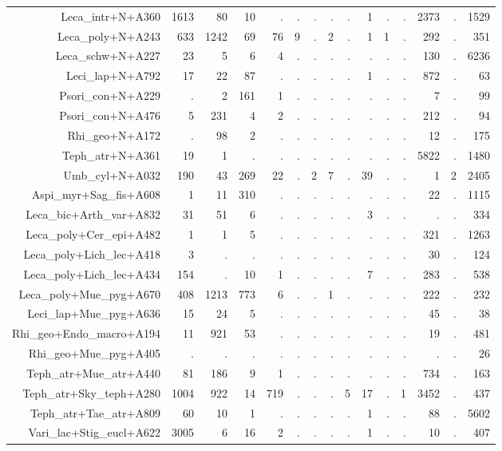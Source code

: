 \documentclass[a4paper, 11]{article}\usepackage[]{graphicx}\usepackage[]{color}
\begin{document}
\begin{table}
\begin{tabular}{rrrrrrrrrrrrrrr}
  Leca\_intr+N+A360 & 1613 & 80 & 10 & . & . & . & . & . & 1 & . & . & 2373 & . & 1529 \\ 
  Leca\_poly+N+A243 & 633 & 1242 & 69 & 76 & 9 & . & 2 & . & 1 & 1 & . & 292 & . & 351 \\ 
  Leca\_schw+N+A227 & 23 & 5 & 6 & 4 & . & . & . & . & . & . & . & 130 & . & 6236 \\ 
  Leci\_lap+N+A792 & 17 & 22 & 87 & . & . & . & . & . & 1 & . & . & 872 & . & 63 \\ 
  Psori\_con+N+A229 & . & 2 & 161 & 1 & . & . & . & . & . & . & . & 7 & . & 99 \\ 
  Psori\_con+N+A476 & 5 & 231 & 4 & 2 & . & . & . & . & . & . & . & 212 & . & 94 \\ 
  Rhi\_geo+N+A172 & . & 98 & 2 & . & . & . & . & . & . & . & . & 12 & . & 175 \\ 
  Teph\_atr+N+A361 & 19 & 1 & . & . & . & . & . & . & . & . & . & 5822 & . & 1480 \\ 
  Umb\_cyl+N+A032 & 190 & 43 & 269 & 22 & . & 2 & 7 & . & 39 & . & . & 1 & 2 & 2405 \\ 
  Aspi\_myr+Sag\_fis+A608 & 1 & 11 & 310 & . & . & . & . & . & . & . & . & 22 & . & 1115 \\ 
  Leca\_bic+Arth\_var+A832 & 31 & 51 & 6 & . & . & . & . & . & 3 & . & . & . & . & 334 \\ 
  Leca\_poly+Cer\_epi+A482 & 1 & 1 & 5 & . & . & . & . & . & . & . & . & 321 & . & 1263 \\ 
  Leca\_poly+Lich\_lec+A418 & 3 & . & . & . & . & . & . & . & . & . & . & 30 & . & 124 \\ 
  Leca\_poly+Lich\_lec+A434 & 154 & . & 10 & 1 & . & . & . & . & 7 & . & . & 283 & . & 538 \\ 
  Leca\_poly+Mue\_pyg+A670 & 408 & 1213 & 773 & 6 & . & . & 1 & . & . & . & . & 222 & . & 232 \\ 
  Leci\_lap+Mue\_pyg+A636 & 15 & 24 & 5 & . & . & . & . & . & . & . & . & 45 & . & 38 \\ 
  Rhi\_geo+Endo\_macro+A194 & 11 & 921 & 53 & . & . & . & . & . & . & . & . & 19 & . & 481 \\ 
  Rhi\_geo+Mue\_pyg+A405 & . & . & . & . & . & . & . & . & . & . & . & . & . & 26 \\ 
  Teph\_atr+Mue\_atr+A440 & 81 & 186 & 9 & 1 & . & . & . & . & . & . & . & 734 & . & 163 \\ 
  Teph\_atr+Sky\_teph+A280 & 1004 & 922 & 14 & 719 & . & . & . & 5 & 17 & . & 1 & 3452 & . & 437 \\ 
  Teph\_atr+Tae\_atr+A809 & 60 & 10 & 1 & . & . & . & . & . & 1 & . & . & 88 & . & 5602 \\ 
  Vari\_lac+Stig\_eucl+A622 & 3005 & 6 & 16 & 2 & . & . & . & . & 1 & . & . & 10 & . & 407 \\ 
   \hline
\end{tabular}
\end{table}
\end{document}
